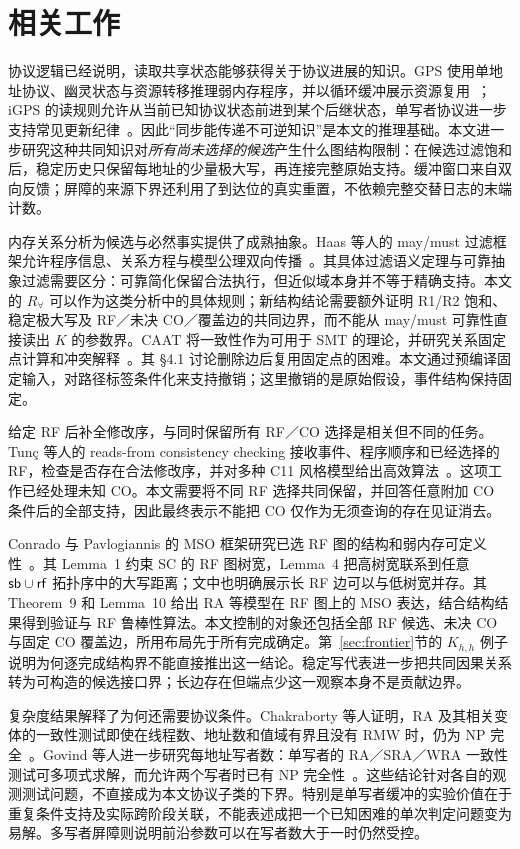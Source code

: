 \section{相关工作}\label{sec:related}
协议逻辑已经说明，读取共享状态能够获得关于协议进展的知识。GPS 使用单地址协议、幽灵状态与资源转移推理弱内存程序，并以循环缓冲展示资源复用~\cite{gps2014}；iGPS 的读规则允许从当前已知协议状态前进到某个后继状态，单写者协议进一步支持常见更新纪律~\cite{igps2017}。因此“同步能传递不可逆知识”是本文的推理基础。本文进一步研究这种共同知识对\emph{所有尚未选择的候选}产生什么图结构限制：在候选过滤饱和后，稳定历史只保留每地址的少量极大写，再连接完整原始支持。缓冲窗口来自双向反馈；屏障的来源下界还利用了到达位的真实重置，不依赖完整交替日志的末端计数。

内存关系分析为候选与必然事实提供了成熟抽象。Haas 等人的 may/must 过滤框架允许程序信息、关系方程与模型公理双向传播~\cite{haas2023}。其具体过滤语义定理与可靠抽象过滤需要区分：可靠简化保留合法执行，但近似域本身并不等于精确支持。本文的 $R_\forall$ 可以作为这类分析中的具体规则；新结构结论需要额外证明 R1/R2 饱和、稳定极大写及 RF／未决 CO／覆盖边的共同边界，而不能从 may/must 可靠性直接读出 $K$ 的参数界。CAAT 将一致性作为可用于 SMT 的理论，并研究关系固定点计算和冲突解释~\cite{haas2022}。其 §4.1 讨论删除边后复用固定点的困难。本文通过预编译固定输入，对路径标签条件化来支持撤销；这里撤销的是原始假设，事件结构保持固定。

给定 RF 后补全修改序，与同时保留所有 RF／CO 选择是相关但不同的任务。Tunç 等人的 reads-from consistency checking 接收事件、程序顺序和已经选择的 RF，检查是否存在合法修改序，并对多种 C11 风格模型给出高效算法~\cite{tunc2023}。这项工作已经处理未知 CO。本文需要将不同 RF 选择共同保留，并回答任意附加 CO 条件后的全部支持，因此最终表示不能把 CO 仅作为无须查询的存在见证消去。

Conrado 与 Pavlogiannis 的 MSO 框架研究已选 RF 图的结构和弱内存可定义性~\cite{conrado2026}。其 Lemma~1 约束 SC 的 RF 图树宽，Lemma~4 把高树宽联系到任意 $\mathsf{sb}\cup\mathsf{rf}$ 拓扑序中的大写距离；文中也明确展示长 RF 边可以与低树宽并存。其 Theorem~9 和 Lemma~10 给出 RA 等模型在 RF 图上的 MSO 表达，结合结构结果得到验证与 RF 鲁棒性算法。本文控制的对象还包括全部 RF 候选、未决 CO 与固定 CO 覆盖边，所用布局先于所有完成确定。第~\ref{sec:frontier}节的 $K_{h,h}$ 例子说明为何逐完成结构界不能直接推出这一结论。稳定写代表进一步把共同因果关系转为可构造的候选接口界；长边存在但端点少这一观察本身不是贡献边界。

复杂度结果解释了为何还需要协议条件。Chakraborty 等人证明，RA 及其相关变体的一致性测试即使在线程数、地址数和值域有界且没有 RMW 时，仍为 NP 完全~\cite{chakraborty2024}。Govind 等人进一步研究每地址写者数：单写者的 RA／SRA／WRA 一致性测试可多项式求解，而允许两个写者时已有 NP 完全性~\cite{govind2026}。这些结论针对各自的观测测试问题，不直接成为本文协议子类的下界。特别是单写者缓冲的实验价值在于重复条件支持及实际跨阶段关联，不能表述成把一个已知困难的单次判定问题变为易解。多写者屏障则说明前沿参数可以在写者数大于一时仍然受控。


